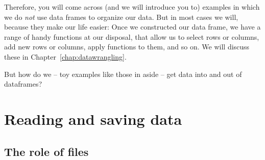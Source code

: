 
Therefore, you will come across (and we will introduce you to) examples in which we do \emph{not} use data frames to organize our data.
But in most cases we will, because they make our life easier:
Once we constructed our data frame, we have a range of handy functions at our disposal, that allow us to select rows or columns, add new rows or columns, apply functions to them, and so on.
We will discuss these in Chapter~\ref{chap:datawrangling}.

But how do we -- toy examples like those in  aside -- get data into and out of dataframes? 










\section{Reading and saving data}
\label{sec:reading}

\subsection{The role of files}

